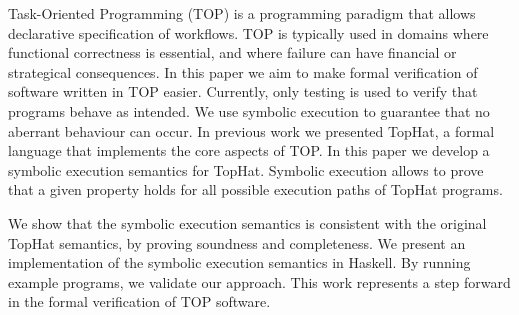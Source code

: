 
Task-Oriented Programming (TOP) is a programming paradigm that allows declarative specification of workflows.
TOP is typically used in domains where functional correctness is essential, and where failure can have financial or strategical consequences.
In this paper we aim to make formal verification of software written in TOP easier.
Currently, only testing is used to verify that programs behave as intended.
We use symbolic execution to guarantee that no aberrant behaviour can occur.
In previous work we presented TopHat, a formal language that implements the core aspects of TOP.
In this paper we develop a symbolic execution semantics for TopHat.
Symbolic execution allows to prove that a given property holds for all possible execution paths of TopHat programs.

We show that the symbolic execution semantics is consistent with the original TopHat semantics, by proving soundness and completeness.
We present an implementation of the symbolic execution semantics in Haskell.
By running example programs, we validate our approach.
This work represents a step forward in the formal verification of TOP software.


